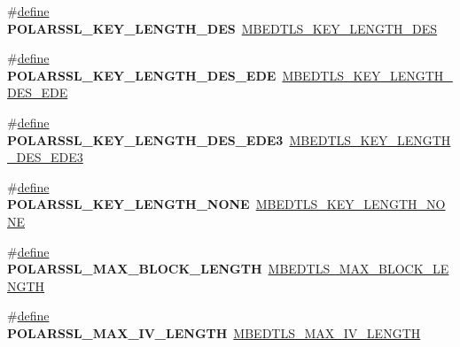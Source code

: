\begin{DoxyCompactItemize}
\item 
\mbox{\label{compat-1_83_8h_af0a819a451398d93d26ed8c74826e035}} 
\#\hyperlink{structdefine}{define} {\bfseries P\+O\+L\+A\+R\+S\+S\+L\+\_\+\+K\+E\+Y\+\_\+\+L\+E\+N\+G\+T\+H\+\_\+\+D\+ES}~\hyperlink{cipher_8h_a9e955e0906c3bee6f74368c8bea0af09a0786b4375829efe98db9d73c5b12eda1}{M\+B\+E\+D\+T\+L\+S\+\_\+\+K\+E\+Y\+\_\+\+L\+E\+N\+G\+T\+H\+\_\+\+D\+ES}
\item 
\mbox{\label{compat-1_83_8h_ac22180150a97ef4556ec884819d886aa}} 
\#\hyperlink{structdefine}{define} {\bfseries P\+O\+L\+A\+R\+S\+S\+L\+\_\+\+K\+E\+Y\+\_\+\+L\+E\+N\+G\+T\+H\+\_\+\+D\+E\+S\+\_\+\+E\+DE}~\hyperlink{cipher_8h_a9e955e0906c3bee6f74368c8bea0af09ade90f9d4c430f18b705faac59b2ed0b9}{M\+B\+E\+D\+T\+L\+S\+\_\+\+K\+E\+Y\+\_\+\+L\+E\+N\+G\+T\+H\+\_\+\+D\+E\+S\+\_\+\+E\+DE}
\item 
\mbox{\label{compat-1_83_8h_a2f488b32778f88809abbad3baf8456b3}} 
\#\hyperlink{structdefine}{define} {\bfseries P\+O\+L\+A\+R\+S\+S\+L\+\_\+\+K\+E\+Y\+\_\+\+L\+E\+N\+G\+T\+H\+\_\+\+D\+E\+S\+\_\+\+E\+D\+E3}~\hyperlink{cipher_8h_a9e955e0906c3bee6f74368c8bea0af09ae5eb36c0a8ae45bec5b0070292be6c17}{M\+B\+E\+D\+T\+L\+S\+\_\+\+K\+E\+Y\+\_\+\+L\+E\+N\+G\+T\+H\+\_\+\+D\+E\+S\+\_\+\+E\+D\+E3}
\item 
\mbox{\label{compat-1_83_8h_a9fbd4355a3b5ffe73e501ff4ec4413f3}} 
\#\hyperlink{structdefine}{define} {\bfseries P\+O\+L\+A\+R\+S\+S\+L\+\_\+\+K\+E\+Y\+\_\+\+L\+E\+N\+G\+T\+H\+\_\+\+N\+O\+NE}~\hyperlink{cipher_8h_a9e955e0906c3bee6f74368c8bea0af09a27a227b285707a038e87cee36a8d1a65}{M\+B\+E\+D\+T\+L\+S\+\_\+\+K\+E\+Y\+\_\+\+L\+E\+N\+G\+T\+H\+\_\+\+N\+O\+NE}
\item 
\mbox{\label{compat-1_83_8h_aa2488bd674e8deee5938b1926f4868f0}} 
\#\hyperlink{structdefine}{define} {\bfseries P\+O\+L\+A\+R\+S\+S\+L\+\_\+\+M\+A\+X\+\_\+\+B\+L\+O\+C\+K\+\_\+\+L\+E\+N\+G\+TH}~\hyperlink{cipher_8h_ab8f30dc90403204515f868c3b6196ffd}{M\+B\+E\+D\+T\+L\+S\+\_\+\+M\+A\+X\+\_\+\+B\+L\+O\+C\+K\+\_\+\+L\+E\+N\+G\+TH}
\item 
\mbox{\label{compat-1_83_8h_aded691b9d905920d9675e7b9828a237c}} 
\#\hyperlink{structdefine}{define} {\bfseries P\+O\+L\+A\+R\+S\+S\+L\+\_\+\+M\+A\+X\+\_\+\+I\+V\+\_\+\+L\+E\+N\+G\+TH}~\hyperlink{cipher_8h_aec294721b811aa0f7dcc940029fd8aab}{M\+B\+E\+D\+T\+L\+S\+\_\+\+M\+A\+X\+\_\+\+I\+V\+\_\+\+L\+E\+N\+G\+TH}

\end{DoxyCompactItemize}
